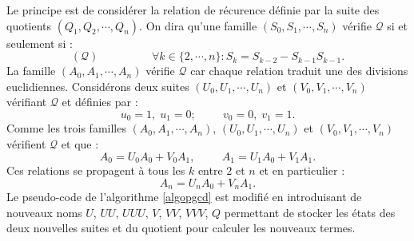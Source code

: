 \begin{demo}
Le principe est de considérer la relation de récurence définie par la suite des quotients $(Q_1,Q_2,\cdots,Q_n)$. On dira qu'une famille $(S_0,S_1,\cdots,S_n)$ vérifie $\mathcal Q$ si et seulement si :
\begin{displaymath}
 (\mathcal Q)\hspace{2cm} \forall k\in\{2,\cdots,n\} : S_k = S_{k-2} - S_{k-1}S_{k-1}.
\end{displaymath}
La famille $(A_0,A_1,\cdots,A_n)$ vérifie $\mathcal Q$ car chaque relation traduit une des divisions euclidiennes.\newline
Considérons deux suites $(U_0,U_1,\cdots,U_n)$ et $(V_0,V_1,\cdots,V_n)$ vérifiant $\mathcal Q$ et définies par :
\[
 u_0=1,\; u_1=0; \hspace{1cm} v_0 = 0,\; v_1 = 1.
\]
Comme les trois familles $(A_0,A_1,\cdots,A_n)$,  $(U_0,U_1,\cdots,U_n)$ et $(V_0,V_1,\cdots,V_n)$ vérifient $\mathcal Q$ et que :
\[
 A_0 = U_0 A_0 + V_0 A_1 ,\hspace{1cm}
 A_1 = U_1 A_0 + V_1 A_1.
\]
Ces relations se propagent à tous les $k$ entre $2$ et $n$ et en particulier :
\begin{displaymath}
 A_n = U_n A_0 + V_n A_1.
\end{displaymath}
Le pseudo-code de l'algorithme \ref{algopgcd} est modifié en introduisant de nouveaux noms $U$, $UU$, $UUU$, $V$, $VV$, $VVV$, $Q$ permettant de stocker les états des deux nouvelles suites et du quotient pour calculer les nouveaux termes.
\end{demo}


